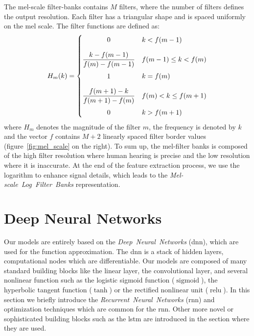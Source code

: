 The mel-scale filter-banks contains $M$ filters, where the number of filters
defines the output resolution.
Each filter has a triangular shape and is spaced uniformly on the mel scale.
The filter functions are defined as:
\begin{align}
H_m(k) =
  \begin{cases}
      \hfill 0                                      \hfill & k < f(m - 1)                   \\[10pt]
      \hfill \dfrac{k - f(m - 1)}{f(m) - f(m - 1)}  \hfill & f(m - 1) \leq k < f(m)         \\[10pt]
      \hfill 1                                      \hfill & k = f(m)                       \\[10pt]
      \hfill \dfrac{f(m + 1) - k}{f(m + 1) - f(m)}  \hfill & f(m) < k \leq f(m + 1)         \\[10pt]
      \hfill 0                                      \hfill & k > f(m + 1)
  \end{cases}
\end{align}
where $H_m$ denotes the magnitude of the filter $m$, the frequency is denoted by $k$ and the vector $f$
contains $M+2$ linearly spaced filter border values (figure~\ref{fig:mel_scale} on the right).
To sum up, the mel-filter banks is composed of the high filter resolution
where human hearing is precise and the low resolution where it is inaccurate.
At the end of the feature extraction process, we use the logarithm to enhance signal details, which
leads to the \textit{Mel-scale~Log~Filter~Banks} representation.


\section{Deep Neural Networks}\label{sec:deep-neural-networks}

Our models are entirely based on the \textit{Deep~Neural~Networks} (\acrshort{dnn}), which are
used for the function approximation.
The \acrshort{dnn} is a stack of hidden layers, computational nodes which are differentiable.
Our models are composed of many standard building blocks like the linear layer, the convolutional layer, and
several nonlinear function such as the logistic sigmoid function ($\operatorname{sigmoid}$), the
hyperbolic tangent function ($\tanh$) or the rectified nonlinear unit ($\operatorname{relu}$).
In this section we briefly introduce the \textit{Recurrent~Neural~Networks} (\acrshort{rnn})
and optimization techniques which are common for the \acrshort{rnn}.
Other more novel or sophisticated building blocks such as the \acrshort{lstm}
are introduced in the section where they are used.


